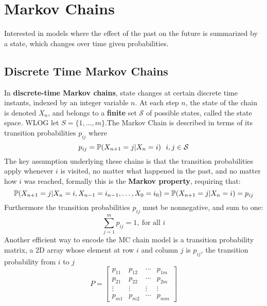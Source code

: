 \documentclass[11pt]{scrartcl}
\begin{document}
\section{Markov Chains}
Interested in models where the effect of the past on the future is summarized
by a state, which changes over time given probabilities.
\subsection{Discrete Time Markov Chains}
In \textbf{discrete-time Markov chains}, state changes at certain discrete time
instants, indexed by an integer variable $n$. At each step $n$, the state of
the chain is denoted $X_{n}$, and belongs to a \textbf{finite} set $\mathcal{S}$ of
possible states, called the state space. WLOG let $S = \{1,\ldots,m\}$.The Markov Chain is described in terms
of its transition probabilities $p_{ij}$ where \[
  p_{ij} = \mathbb{P}(X_{n+1} = j | X_{n}=i) ~~ i,j \in \mathcal{S}
\] 
The key assumption underlying these chains is that the transition probabilities
apply whenever $i$ is visited, no matter what happened in the past, and no
matter how $i$ was reached, formally this is the \textbf{Markov property},
requiring that: \[
  \mathbb{P}(X_{n+1} = j | X_{n}=i, X_{n-1}=i_{n-1},\ldots,X_0=i_0) = \mathbb{P}(X_{n+1}=j
  | X_{n}=i) = p_{ij}
\] Furthermore the transition probabilities $p_{ij}$ must be nonnegative, and
sum to one: \[
  \sum_{j=1}^{m}  p_{ij} = 1, ~\text{for all }i
\] 
Another efficient way to encode the MC chain model is a transition probability
matrix, a 2D array whose element at row $i$ and column $j$ is $p_{ij}$, the
transition probability from $i$ to $j$ \[
P = \begin{bmatrix}
  p_{11} & p_{12} & \cdots & p_{1m} \\
  p_{21} & p_{22} & \cdots & p_{2m} \\
  \vdots & \vdots & \vdots & \vdots \\
  p_{m 1} & p_{m 2} & \cdots & p_{mm}
\end{bmatrix}
\] 
\end{document}
